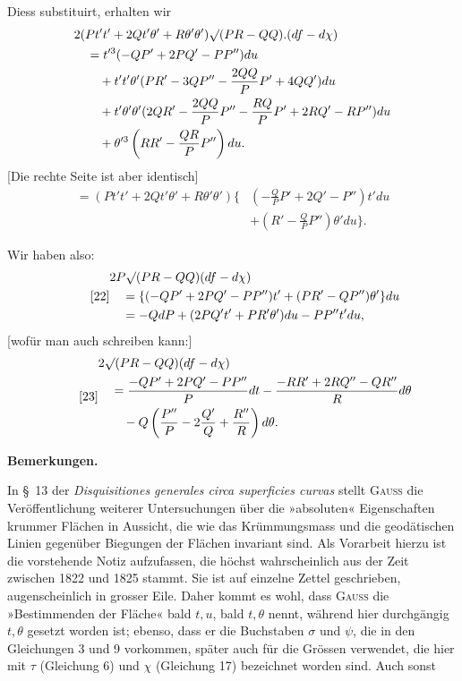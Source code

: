 %
\noindent Diess substituirt, erhalten wir
\[
\begin{aligned}
&2(Pt't'+2Qt'\theta'+R\theta'\theta')\mathord{\surd}(PR-QQ).(df-d\chi)\\
&\quad=t'^3(-QP'+2PQ'-PP'')du\\
&\qquad+t't'\theta'(PR'-3QP''-\frac{2QQ}{P}P'+4QQ')du\\
&\qquad+t'\theta'\theta'(2QR'-\frac{2QQ}{P}P''-\frac{RQ}{P}P'+2RQ'-RP'')du\\
&\qquad+\theta'^3\left(RR'-\frac{QR}{P}P''\right)du.
\end{aligned}
\]
[Die rechte Seite ist aber identisch]
\[
\begin{aligned}
=(Pt't'+2Qt'\theta'+R\theta'\theta')\{&\left(-\frac QP P'+2Q'-P''\right)t'du\\
&+\left(R'-\frac QP P''\right)\theta'du\}.
\end{aligned}
\]

Wir haben also:
\begin{equation}\tag*{[22]}
\begin{aligned}
&2P\mathord{\surd}(PR-QQ)(df-d\chi)\\
&\quad=\{(-QP'+2PQ'-PP'')t'+(PR'-QP'')\theta'\}du\\
&\quad=-QdP+(2PQ't'+PR'\theta')du-PP''t'du,
\end{aligned}
\end{equation}
[wofür man auch schreiben kann:]
\begin{equation}\tag*{[23]}
\begin{aligned}
&2\mathord{\surd}(PR-QQ)(df-d\chi)\\
&\quad=\frac{-QP'+2PQ'-PP''}{P}dt-\frac{-RR'+2RQ''-QR''}{R}d\theta\\
&\qquad-Q\left(\frac{P''}{P}-2\frac{Q'}{Q}+\frac{R''}{R}\right)d\theta.
\end{aligned}
\end{equation}
\begin{center}\bfseries Bemerkungen.\end{center}
\noindent\hspace*{1.2em}In \S\ 13 der \textit{Disquisitiones generales circa superficies curvas} stellt \textsc{Gauss} die Veröffentlichung weiterer Untersuchungen über die »absoluten« Eigenschaften krummer Flächen in Aussicht, die wie das Krümmungsmass und die geodätischen Linien gegenüber Biegungen der Flächen invariant sind. Als Vorarbeit hierzu ist die vorstehende Notiz aufzufassen, die höchst wahrscheinlich aus der Zeit zwischen 1822 und 1825 stammt. Sie ist auf einzelne Zettel geschrieben, augenscheinlich in grosser Eile. Daher kommt es wohl, dass \textsc{Gauss} die »Bestimmenden der Fläche« bald $t,u$, bald $t,\theta$ nennt, während hier durchgängig $t,\theta$ gesetzt worden ist; ebenso, dass er die Buchstaben $\sigma$ und $\psi$, die in den Gleichungen 3 und 9 vorkommen, später auch für die Grössen verwendet, die hier mit $\tau$ (Gleichung 6) und $\chi$ (Gleichung 17) bezeichnet worden sind. Auch sonst

